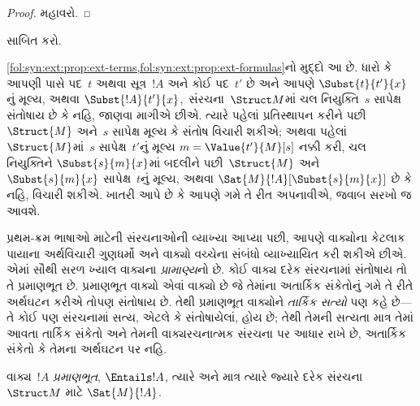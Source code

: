 \begin{proof}
મહાવરો.
\end{proof}

\begin{prob}
 સાબિત કરો.
\end{prob}

\begin{explain}
  \cref{fol:syn:ext:prop:ext-terms,fol:syn:ext:prop:ext-formulas}નો
  મુદ્દો આ છે. ધારો કે આપણી પાસે પદ~$t$ અથવા સૂત્ર~$!A$ અને કોઈ
  પદ~$t'$ છે અને આપણે $\Subst{t}{t'}{x}$નું મૂલ્ય, અથવા
  $\Subst{!A}{t'}{x}$,~સંરચના~$\Struct M$માં ચલ
  નિયુક્તિ~$s$ સાપેક્ષ સંતોષાય છે કે નહિ, જાણવા માગીએ છીએ. ત્યારે
  પહેલાં પ્રતિસ્થાપન કરીને પછી~$\Struct{M}$ અને~$s$ સાપેક્ષ મૂલ્ય કે
  સંતોષ વિચારી શકીએ; અથવા પહેલાં~$\Struct{M}$માં~$s$ સાપેક્ષ~$t'$નું
  મૂલ્ય $m=\Value{t'}{M}[s]$ નક્કી કરી, ચલ નિયુક્તિને
  $\Subst{s}{m}{x}$માં બદલીને પછી~$\Struct{M}$ અને
  $\Subst{s}{m}{x}$ સાપેક્ષ~$t$નું મૂલ્ય, અથવા
  $\Sat{M}{!A}[\Subst{s}{m}{x}]$ છે કે નહિ, વિચારી શકીએ.
  ખાતરી આપે છે કે આપણે ગમે તે રીત અપનાવીએ, જવાબ સરખો જ આવશે.
\end{explain}
\endgroup


\begingroup
\makeatletter{}\makeatother

\label{guunit:OLP-0166}


\begin{explain}
પ્રથમ-ક્રમ ભાષાઓ માટેની સંરચનાઓની વ્યાખ્યા આપ્યા પછી, આપણે
વાક્યોના કેટલાક પાયાના અર્થવિચારી ગુણધર્મો અને વાક્યો વચ્ચેના સંબંધો
વ્યાખ્યાયિત કરી શકીએ છીએ. એમાં સૌથી સરળ ખ્યાલ વાક્યના
\emph{પ્રામાણ્ય}નો છે. કોઈ વાક્ય દરેક સંરચનામાં સંતોષાય તો તે
પ્રમાણભૂત છે. પ્રમાણભૂત વાક્યો એવાં વાક્યો છે જે તેમાંના અતાર્કિક
સંકેતોનું ગમે તે રીતે અર્થઘટન કરીએ તોપણ સંતોષાય છે. તેથી પ્રમાણભૂત
વાક્યોને \emph{તાર્કિક સત્યો} પણ કહે છે---તે કોઈ પણ સંરચનામાં
સત્ય, એટલે કે સંતોષાયેલાં, હોય છે; તેથી તેમની સત્યતા માત્ર તેમાં આવતા
તાર્કિક સંકેતો અને તેમની વાક્યરચનાત્મક સંરચના પર આધાર રાખે છે,
અતાર્કિક સંકેતો કે તેમના અર્થઘટન પર નહિ.
\end{explain}

\begin{defn}[પ્રામાણ્ય]
વાક્ય~$!A$ \emph{પ્રમાણભૂત}, $\Entails !A$, ત્યારે અને માત્ર ત્યારે
જ્યારે દરેક સંરચના~$\Struct M$ માટે $\Sat{M}{!A}$.
\end{defn}

